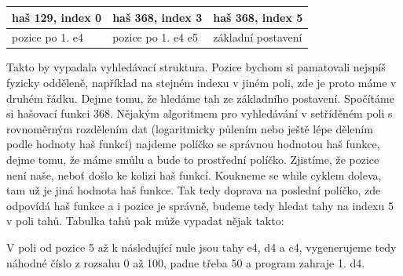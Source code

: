 \documentclass[11pt, titlepage]{article}
\begin{document}
\vskip 0.5cm
\noindent
\begin{tabular}{|l|l|l|}
\hline
haš 129, index 0 & haš 368, index 3 & haš 368, index 5 \\
\hline
pozice po 1. e4 & pozice po 1. e4 e5 & základní postavení \\
\hline
\end{tabular}
\vskip 0.5cm

Takto by vypadala vyhledávací struktura. Pozice bychom si pamatovali nejspíš fyzicky odděleně, například na stejném indexu v jiném poli, zde je proto máme v druhém řádku. Dejme tomu, že hledáme tah ze základního postavení. Spočítáme si hašovací funkci 368. Nějakým algoritmem pro vyhledávání v setříděném poli s rovnoměrným rozdělením dat (logaritmicky půlením nebo ještě lépe dělením podle hodnoty haš funkcí) najdeme políčko se správnou hodnotou haš funkce, dejme tomu, že máme smůlu a bude to prostřední políčko. Zjistíme, že pozice není naše, neboť došlo ke kolizi haš funkcí. Koukneme se while cyklem doleva, tam už je jiná hodnota haš funkce. Tak tedy doprava na poslední políčko, zde odpovídá haš funkce a i pozice je správně, budeme tedy hledat tahy na indexu 5 v poli tahů. Tabulka tahů pak může vypadat nějak takto:

V poli od pozice 5 až k následující nule jsou tahy e4, d4 a c4, vygenerujeme tedy náhodné číslo z rozsahu 0 až 100, padne třeba 50 a program zahraje 1. d4.
\end{document}
